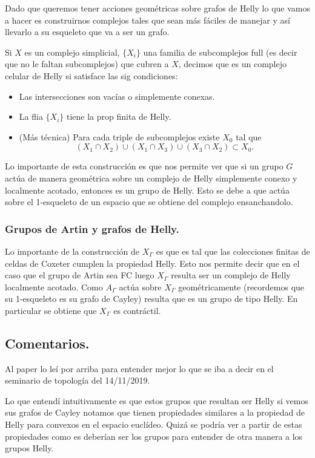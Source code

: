 \documentclass[13pt]{scrartcl}
\theoremstyle{plain} %
\theoremstyle{definition}
\theoremstyle{remark}
\newcommand{\blue}{\textcolor{chulo}}
\begin{document}
	Dado que queremos tener acciones geométricas sobre grafos de Helly lo que vamos a hacer es construirnos complejos tales que sean más fáciles de manejar y así llevarlo a su esqueleto que va a ser un grafo.
	
	Si $X$ es un complejo simplicial, $\{X_i\}$ una familia de subcomplejos full (es decir que no le faltan subcomplejos) que cubren a $X$, decimos que es un \blue{complejo celular de Helly} si satisface las sig condiciones:
	\begin{itemize}
		\item Las intersecciones son vacías o simplemente conexas.
		\item La flia $\{X_i\}$ tiene la prop finita de Helly.
		\item (Más técnica) Para cada triple de subcomplejos existe $X_0$ tal que 
		\[
		(X_1 \cap X_2) \cup (X_1 \cap X_3) \cup (X_3 \cap X_2) \subset X_0.
		\]
		
	\end{itemize} 

	Lo importante de esta construcción es que nos permite ver que si un grupo $G$ actúa de manera geométrica sobre un complejo de Helly simplemente conexo y localmente acotado, entonces es un grupo de Helly. Esto se debe a que actúa sobre el 1-esqueleto de un espacio que se obtiene del complejo ensanchandolo.
	
	
	\subsubsection{Grupos de Artin y grafos de Helly.}
	
	Lo importante de la construcción de $X_\Gamma$ es que es tal que las colecciones finitas de celdas de Coxeter cumplen la propiedad Helly. Esto nos permite decir que en el caso que el grupo de Artin sea FC luego $X_\Gamma$ resulta ser un complejo de Helly localmente acotado. Como $A_\Gamma$ actúa sobre $X_\Gamma$ geométricamente (recordemos que su 1-esqueleto es su grafo de Cayley) resulta que es un grupo de tipo Helly. En particular se obtiene que $X_\Gamma$ es contráctil.
	
	\subsection{Comentarios.}
	
	Al paper lo leí por arriba para entender mejor lo que se iba a decir en el seminario de topología del 14/11/2019.
	
	Lo que entendí intuitivamente es que estos grupos que resultan ser Helly si vemos sus grafos de Cayley notamos que tienen propiedades similares a la propiedad de Helly para convexos en el espacio euclídeo. Quizá se podría ver a partir de estas propiedades como es deberían ser los grupos para entender de otra manera a los grupos Helly.
	
\end{document}
